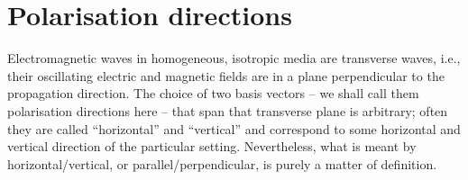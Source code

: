 \section{Polarisation directions}
\label{sec:polarization:directions}
Electromagnetic waves in homogeneous, isotropic media are transverse
waves, i.e., their oscillating electric and magnetic fields are in a
plane perpendicular to the propagation direction. The choice of two
basis vectors -- we shall call them polarisation directions here --
that span that transverse plane is arbitrary; often they are called
``horizontal'' and ``vertical'' and correspond to some horizontal and
vertical direction of the particular setting. Nevertheless, what is
meant by horizontal/vertical, or parallel/perpendicular, is purely a
matter of definition.

